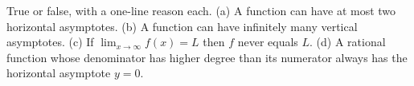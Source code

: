 \begin{exercise}[Conceptual]
True or false, with a one-line reason each. (a) A function can have at most two
horizontal asymptotes. (b) A function can have infinitely many vertical
asymptotes. (c) If $\lim_{x\to\infty}f(x)=L$ then $f$ never equals $L$. (d) A
rational function whose denominator has higher degree than its numerator always
has the horizontal asymptote $y=0$.
\end{exercise}
